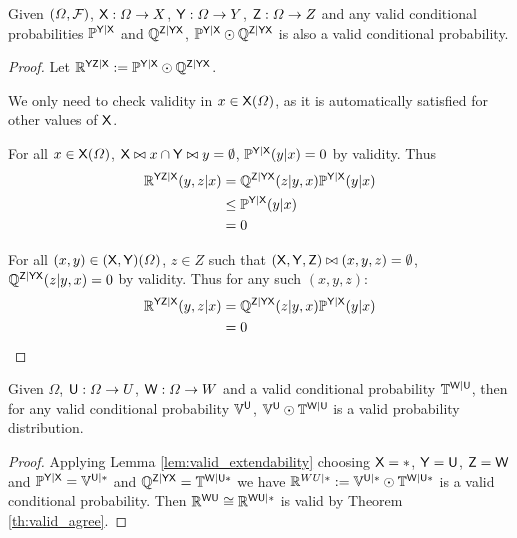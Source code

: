 \begin{lemma}\label{lem:valid_extendability}
Given $(\Omega,\mathcal{F})$, $\mathsf{X}:\Omega\to X$, $\mathsf{Y}:\Omega\to Y$, $\mathsf{Z}:\Omega\to Z$ and any valid conditional probabilities $\mathbb{P}^{\mathsf{Y}|\mathsf{X}}$ and $\mathbb{Q}^{\mathsf{Z}|\mathsf{Y}\mathsf{X}}$, $ \mathbb{P}^{\mathsf{Y}|\mathsf{X}}\odot \mathbb{Q}^{\mathsf{Z}|\mathsf{Y}\mathsf{X}}$ is also a valid conditional probability.
\end{lemma}

\begin{proof}
Let $\mathbb{R}^{\mathsf{YZ}|\mathsf{X}}:=\mathbb{P}^{\mathsf{Y}|\mathsf{X}}\odot \mathbb{Q}^{\mathsf{Z}|\mathsf{Y}\mathsf{X}}$.

We only need to check validity in $x\in \mathsf{X}(\Omega)$, as it is automatically satisfied for other values of $\mathsf{X}$.

For all $x\in \mathsf{X}(\Omega)$, $\mathsf{X}\bowtie x\cap\mathsf{Y}\bowtie y=\emptyset$, $\mathbb{P}^{\mathsf{Y}|\mathsf{X}}(y|x)=0$ by validity. Thus
\begin{align}
	\mathbb{R}^{\mathsf{YZ}|\mathsf{X}}(y,z|x) &= \mathbb{Q}^{\mathsf{Z}|\mathsf{YX}}(z|y,x)\mathbb{P}^{\mathsf{Y}|\mathsf{X}}(y|x)\\
								  &\leq \mathbb{P}^{\mathsf{Y}|\mathsf{X}}(y|x)\\
								  &=0
\end{align}

For all $(x,y)\in (\mathsf{X},\mathsf{Y})(\Omega)$, $z\in Z$ such that $(\mathsf{X},\mathsf{Y},\mathsf{Z})\bowtie (x,y,z)=\emptyset$, $\mathbb{Q}^{\mathsf{Z}|\mathsf{YX}}(z|y,x)=0$ by validity. Thus for any such $(x,y,z)$:
\begin{align}
	\mathbb{R}^{\mathsf{YZ}|\mathsf{X}}(y,z|x) &= \mathbb{Q}^{\mathsf{Z}|\mathsf{YX}}(z|y,x)\mathbb{P}^{\mathsf{Y}|\mathsf{X}}(y|x)\\
								  &=0
\end{align}
\end{proof}

\begin{corollary}
Given $\Omega$, $\mathsf{U}:\Omega\to U$, $\mathsf{W}:\Omega\to W$ and a valid conditional probability $\mathbb{T}^{\mathsf{W}|\mathsf{U}}$, then for any valid conditional probability $\mathbb{V}^{\mathsf{U}}$, $\mathbb{V}^{\mathsf{U}}\odot \mathbb{T}^{\mathsf{W}|\mathsf{U}}$ is a valid probability distribution.
\end{corollary}

\begin{proof}
Applying Lemma \ref{lem:valid_extendability} choosing $\mathsf{X}=*$, $\mathsf{Y}=\mathsf{U}$, $\mathsf{Z}=\mathsf{W}$ and $\mathbb{P}^{\mathsf{Y}|\mathsf{X}}=\mathbb{V}^{\mathsf{U}|*}$ and $\mathbb{Q}^{\mathsf{Z}|\mathsf{YX}}=\mathbb{T}^{\mathsf{W}|\mathsf{U*}}$ we have $\mathbb{R}^{WU|*}:=\mathbb{V}^{\mathsf{U}|*}\odot \mathbb{T}^{\mathsf{W}|\mathsf{U}*}$ is a valid conditional probability. Then $\mathbb{R}^{\mathsf{WU}}\cong \mathbb{R}^{\mathsf{WU}|*}$ is valid by Theorem \ref{th:valid_agree}.
\end{proof}


